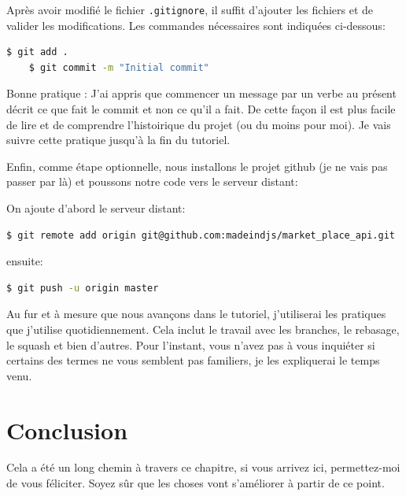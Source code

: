 \documentclass[]{report}
\begin{document}
    Après avoir modifié le fichier \verb|.gitignore|, il suffit d'ajouter les fichiers et de valider les modifications. Les commandes nécessaires sont indiquées ci-dessous:

    \begin{scriptsize}
    \begin{lstlisting}[language=bash, breaklines]
    $ git add .
    $ git commit -m "Initial commit"
    \end{lstlisting}
    \end{scriptsize}

    Bonne pratique : J'ai appris que commencer un message par un verbe au présent décrit ce que fait le commit et non ce qu'il a fait. De cette façon il est plus facile de lire et de comprendre l'histoirique du projet (ou du moins pour moi). Je vais suivre cette pratique jusqu'à la fin du tutoriel.

    Enfin, comme étape optionnelle, nous installons le projet github (je ne vais pas passer par là) et poussons notre code vers le serveur distant:

    On ajoute d'abord le serveur distant:

    \begin{scriptsize}
    \begin{lstlisting}[language=bash, breaklines]
    $ git remote add origin git@github.com:madeindjs/market_place_api.git
    \end{lstlisting}
    \end{scriptsize}

    ensuite:

    \begin{scriptsize}
    \begin{lstlisting}[language=bash, breaklines]
    $ git push -u origin master
    \end{lstlisting}
    \end{scriptsize}

    Au fur et à mesure que nous avançons dans le tutoriel, j'utiliserai les pratiques que j'utilise quotidiennement. Cela inclut le travail avec les branches, le rebasage, le squash et bien d'autres. Pour l'instant, vous n'avez pas à vous inquiéter si certains des termes ne vous semblent pas familiers, je les expliquerai le temps venu.

  \section{Conclusion}

    Cela a été un long chemin à travers ce chapitre, si vous arrivez ici, permettez-moi de vous féliciter. Soyez sûr que les choses vont s'améliorer à partir de ce point.
\end{document}
